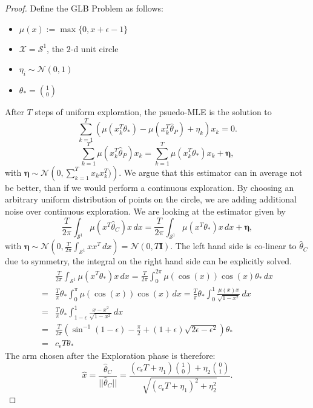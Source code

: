 \documentclass[twoside]{article} \usepackage{aistats2017}
\begin{document}
\begin{proof}
    
    Define the GLB Problem as follows:
    \begin{itemize}
    \item $\mu(x) := \max\{0, x+\epsilon-1\}$
    \item $\mathcal{X} = \mathcal{S}^1$, the $2$-d unit circle
    \item $\eta_i\sim \mathcal{N}(0,1)$
    \item $\theta_* = \binom{1}{0}
    $
    \end{itemize}
    After $T$ steps of uniform exploration, the psuedo-MLE is the solution to
    $$\sum_{k=1}^T\left(\mu(x_k^T\theta_*)-\mu(x_k^T\hat{\theta}_P)+\eta_k\right)x_k=0.$$
    $$\sum_{k=1}^T\mu(x_k^T\hat{\theta}_P)x_k = \sum_{k=1}^T\mu(x_k^T\theta_*)x_k + \boldsymbol{\eta},$$
    with $\boldsymbol{\eta}\sim \mathcal{N}\left(0,\sum_{k=1}^Tx_kx_k^T)\right)$.
    We argue that this estimator can in average not be better, than if we would perform a continuous exploration.
    By choosing an arbitrary uniform distribution of points on the circle, we are adding additional noise over continuous exploration. We are looking at the estimator given by
    $$\frac{T}{2\pi}\int_{\mathcal{S}^1}\mu(x^T\hat{\theta}_C)x\,dx = \frac{T}{2\pi}\int_{\mathcal{S}^1}\mu(x^T\theta_*)x\,dx + \boldsymbol{\eta},$$
    with $\boldsymbol{\eta}\sim \mathcal{N}(0,\frac{T}{2\pi}\int_{\mathcal{S}^1}xx^T\,dx)=\mathcal{N}(0,T\mathbf{I})$.
    The left hand side is co-linear to $\hat{\theta}_C$ due to symmetry, the integral on the right hand side can be explicitly solved.
    \begin{align*}
    &\frac{T}{2\pi}\int_{\mathcal{S}^1}\mu(x^T\theta_*)x\,dx = \frac{T}{2\pi}\int_{0}^{2\pi}\mu(\cos(x))\cos(x)\theta_*\,dx \\
    =&\frac{T}{\pi}\theta_*\int_{0}^{\pi}\mu(\cos(x))\cos(x)\,dx=\frac{T}{\pi}\theta_*\int_{0}^{1}\frac{\mu(x)x}{\sqrt{1-x^2}}\,dx\\
    =&\frac{T}{\pi}\theta_*\int_{1-\epsilon}^{1}\frac{x-x^2}{\sqrt{1-x^2}}\,dx\\
    =&\frac{T}{2\pi}\left(\sin^{-1}(1-\epsilon)-\frac{\pi}{2}+(1+\epsilon)\sqrt{2\epsilon-\epsilon^2}\right)\theta_*\\
    =&c_\epsilon T\theta_*
    \end{align*}
    The arm chosen after the Exploration phase is therefore:
    $$\hat{x} = \frac{\hat{\theta}_C}{||\hat{\theta}_C||}=\frac{(c_\epsilon T+\eta_1)\binom{1}{0}+\eta_2\binom{0}{1}}{\sqrt{(c_\epsilon T+\eta_1)^2+\eta_2^2}}.$$

\end{proof}
\end{document}
